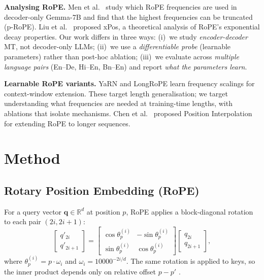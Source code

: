 \documentclass[conference]{IEEEtran}
\begin{document}
\textbf{Analysing RoPE.} Men et al.~\cite{men2024roundandround} study
which RoPE frequencies are used in decoder-only Gemma-7B and find that the
highest frequencies can be truncated (p-RoPE). Liu et al.~\cite{liu2022xpos}
proposed xPos, a theoretical analysis of RoPE's exponential decay properties.
Our work differs in three ways:
(i)~we study \emph{encoder-decoder} MT, not decoder-only LLMs;
(ii)~we use a \emph{differentiable probe} (learnable parameters) rather than
post-hoc ablation;
(iii)~we evaluate across \emph{multiple language pairs} (En--De, Hi--En, Bn--En)
and report \emph{what the parameters learn}.

\textbf{Learnable RoPE variants.} YaRN \cite{peng2023yarn} and
LongRoPE \cite{ding2024longrope} learn frequency scalings for context-window
extension. These target length generalisation; we target understanding what
frequencies are needed at training-time lengths, with ablations that isolate
mechanisms. Chen et al.~\cite{chen2023extending} proposed Position
Interpolation for extending RoPE to longer sequences.

\section{Method}
\label{sec:method}

\subsection{Rotary Position Embedding (RoPE)}

For a query vector $\mathbf{q} \in \mathbb{R}^d$ at position $p$, RoPE
applies a block-diagonal rotation to each pair $(2i, 2i{+}1)$:
\begin{equation}
  \begin{bmatrix} q'_{2i} \\ q'_{2i+1} \end{bmatrix}
  =
  \begin{bmatrix} \cos\theta_p^{(i)} & -\sin\theta_p^{(i)} \\
                  \sin\theta_p^{(i)} &  \cos\theta_p^{(i)} \end{bmatrix}
  \begin{bmatrix} q_{2i} \\ q_{2i+1} \end{bmatrix},
\end{equation}
where $\theta_p^{(i)} = p \cdot \omega_i$ and $\omega_i = 10000^{-2i/d}$.
The same rotation is applied to keys, so the inner product depends only on
relative offset $p - p'$ \cite{su2021roformer}.
\end{document}
